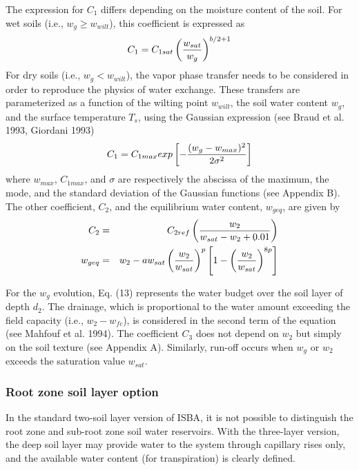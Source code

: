 The expression for $C_1$ differs depending on the moisture content
of the soil.  For wet soils
(i.e., $w_g \geq w_{wilt}$), this coefficient is expressed as
\begin{eqnarray}
C_1 = C_{1sat} \left( {w_{sat} \over w_g} \right)^{b/2+1}
\end{eqnarray}
For dry soils (i.e., $w_g < w_{wilt}$),
the vapor phase transfer needs to be considered in order to reproduce the
physics of water exchange.  These transfers are parameterized
as a function of the wilting point $w_{wilt}$, the soil water
content $w_g$,
and the surface temperature $T_s$, using the Gaussian expression
(see Braud et al. 1993, Giordani 1993)
\begin{eqnarray}
C_1 = C_{1max} exp \left[ - { (w_g-w_{max})^2 \over 2 \sigma^2 } \right]
\end{eqnarray}
where $w_{max}$, $C_{1max}$, and $\sigma$ are respectively the abscissa
of the maximum, the mode, and the standard deviation of the
Gaussian functions (see Appendix B).
The other coefficient, $C_2$, and the equilibrium water
content, $w_{geq}$, are given by
\begin{eqnarray}
C_2&=&C_{2ref} \left( {w_2 \over w_{sat}-w_2+0.01} \right) \\
w_{geq}&=&w_2 - a w_{sat} \left( { w_2 \over w_{sat}} \right)^p
\left[ 1 - \left({ w_2 \over w_{sat}} \right)^{8p} \right]
\end{eqnarray}

For the $w_g$ evolution,
Eq. (13) represents the water budget over the soil
layer of depth $d_2$.  The drainage, which is proportional to the water
amount exceeding the field capacity (i.e., $w_2-w_{fc}$),
is considered in the second term of the equation (see
Mahfouf et al. 1994).  The coefficient $C_3$ does not depend
on $w_2$ but simply on the soil texture (see Appendix A).  Similarly,
run-off occurs when $w_g$ or $w_2$ exceeds the saturation
value $w_{sat}$.

\subsubsection{Root zone soil layer option}

In the standard two-soil layer version of ISBA, it is not possible
to distinguish the root zone and sub-root zone soil water reservoirs.
With the three-layer version,
the deep soil layer may provide water
to the system through capillary rises only, and the available
water content (for transpiration) is clearly defined.

